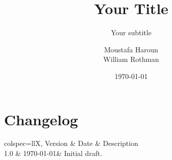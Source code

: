 \documentclass[fleqn,12pt]{article}
\title{Your Title}
\subtitle{Your subtitle}
\author{Moustafa Haroun\\William Rothman} %
\date{\today}
\begin{document}
\maketitle

\newpage
\section{Changelog}\label{sec:changelog}

\begin{htable}[
		caption = {Changelog},
		label = {tab:changelog},
	]{
		colspec={llX},
	}
	Version & Date & Description \\
	1.0 & \today & Initial draft. \\
\end{htable}

\newpage
\tableofcontents


\newpage
\printbibliography
\end{document}
